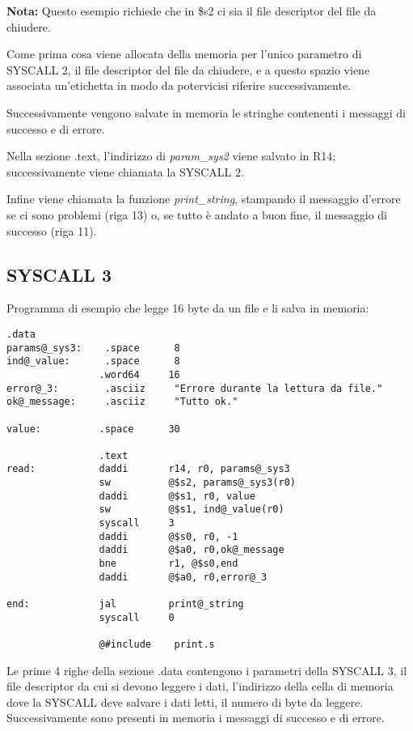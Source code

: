 \documentclass[letterpaper,10pt,english]{sphinxmanual}
\begin{document}
\textbf{Nota:} Questo esempio richiede che in \$s2 ci sia il file descriptor del
file da chiudere.

Come prima cosa viene allocata della memoria per l'unico parametro di SYSCALL
2, il file descriptor del file da chiudere, e a questo spazio viene associata
un'etichetta in modo da potervicisi riferire successivamente.

Successivamente vengono salvate in memoria le stringhe contenenti i messaggi
di successo e di errore.

Nella sezione .text, l'indirizzo di \emph{param\_sys2} viene salvato in R14;
successivamente viene chiamata la SYSCALL 2.

Infine viene chiamata la funzione \emph{print\_string}, stampando il messaggio
d'errore se ci sono problemi (riga 13) o, se tutto è andato a buon fine, il
messaggio di successo (riga 11).


\subsection{SYSCALL 3}
\label{examples:syscall-3}
Programma di esempio che legge 16 byte da un file e li salva in memoria:

\begin{Verbatim}[commandchars=@\[\]]
                .data
params@_sys3:    .space      8
ind@_value:      .space      8
                .word64     16
error@_3:        .asciiz     "Errore durante la lettura da file."
ok@_message:     .asciiz     "Tutto ok."

value:          .space      30

                .text
read:           daddi       r14, r0, params@_sys3
                sw          @$s2, params@_sys3(r0)
                daddi       @$s1, r0, value
                sw          @$s1, ind@_value(r0)
                syscall     3
                daddi       @$s0, r0, -1
                daddi       @$a0, r0,ok@_message
                bne         r1, @$s0,end
                daddi       @$a0, r0,error@_3

end:            jal         print@_string
                syscall     0

                @#include    print.s
\end{Verbatim}

Le prime 4 righe della sezione .data contengono i parametri della SYSCALL 3,
il file descriptor da cui si devono leggere i dati, l'indirizzo della cella di
memoria dove la SYSCALL deve salvare i dati letti, il numero di byte da
leggere. Successivamente sono presenti in memoria i messaggi di successo e di
errore.
\end{document}
